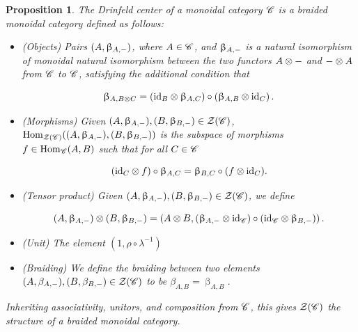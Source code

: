 \documentclass{article}
\newtheorem{proposition}{Proposition}[section]
\theoremstyle{definition}
\numberwithin{figure}{section}
\begin{document}
\begin{proposition} The Drinfeld center of a monoidal category $\mathscr{C}$ is a braided monoidal category defined as follows:

\begin{itemize}
\item (Objects) Pairs $(A,\upbeta_{A,\--})$, where $A\in \mathscr{C}$, and $\upbeta_{A,\--}$ is a natural isomorphism of monoidal natural isomorphism between the two functors $A\otimes \--$ and $\--\otimes A$ from $\mathscr{C}$ to $\mathscr{C}$, satisfying the additional condition that

$$\upbeta_{A,B\otimes C}=\left(\mathrm{id}_{B}\otimes \upbeta_{A,C}\right)\circ \left(\upbeta_{A,B}\otimes \mathrm{id}_C\right).$$

\item (Morphisms) Given $(A,\upbeta_{A,\--}), (B,\upbeta_{B,\--})\in \mathcal{Z}(\mathscr{C})$, $\mathrm{Hom}_{\mathcal{Z}(\mathscr{C})}((A,\upbeta_{A,\--}),(B,\upbeta_{B,\--}))$ is the subspace of morphisms $f\in \mathrm{Hom}_{\mathscr{C}}(A,B)$ such that for all $C\in \mathscr{C}$

$$\left(\mathrm{id}_{C}\otimes f\right)\circ \upbeta_{A,C}=\upbeta_{B,C}\circ (f\otimes \mathrm{id}_C).$$

\item (Tensor product) Given $(A,\upbeta_{A,\--}), (B,\upbeta_{B,\--})\in \mathcal{Z}(\mathscr{C})$, we define

$$(A,\upbeta_{A,\--})\otimes (B,\upbeta_{B,\--})=\left(A\otimes B, (\upbeta_{A,\--}\otimes \mathrm{id}_{\mathscr{C}})\circ (\mathrm{id}_{\mathscr{C}}\otimes \upbeta_{B,\--}) \right).$$

\item (Unit) The element $(1,\rho\circ \lambda^{-1})$

\item (Braiding) We define the braiding between two elements $(A,\beta_{A,\--}), (B,\beta_{B,\--})\in \mathcal{Z}(\mathscr{C})$ to be $\beta_{A,B}=\upbeta_{A,B}$.
\end{itemize}

Inheriting associativity, unitors, and composition from $\mathscr{C}$, this gives $\mathcal{Z}(\mathscr{C})$ the structure of a braided monoidal category.
\end{proposition}
\end{document}
